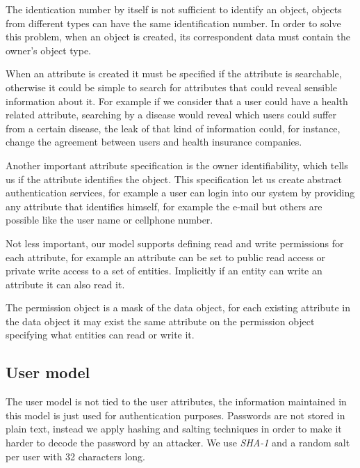The identication number by itself is not sufficient to identify an object, objects from different types can have the same identification number. In order to solve this problem, when an object is created, its correspondent data must contain the owner's object type. 

When an attribute is created it must be specified if the attribute is searchable, otherwise it could be simple to search for attributes that could reveal sensible information about it. For example if we consider that a user could have a health related attribute, searching by a disease would reveal which users could suffer from a certain disease, the leak of that kind of information could, for instance, change the agreement between users and health insurance companies.

Another important attribute specification is the owner identifiability, which tells us if the attribute identifies the object. This specification let us create abstract authentication services, for example a user can login into our system by providing any attribute that identifies himself, for example the e-mail but others are possible like the user name or cellphone number. 


Not less important, our model supports defining read and write permissions for each attribute, for example an attribute can be set to public read access or private write access to a set of entities. Implicitly if an entity can write an attribute it can also read it.

The permission object is a mask of the data object, for each existing attribute in the data object it may exist the same attribute on the permission object specifying what entities can read or write it.

\subsection{User model}

The user model is not tied to the user attributes, the information maintained in this model is just used for authentication purposes. Passwords are not stored in plain text, instead we apply hashing and salting techniques \cite{password} in order to make it harder to decode the password by an attacker. We use \emph{SHA-1} and a random salt per user with 32 characters long.

